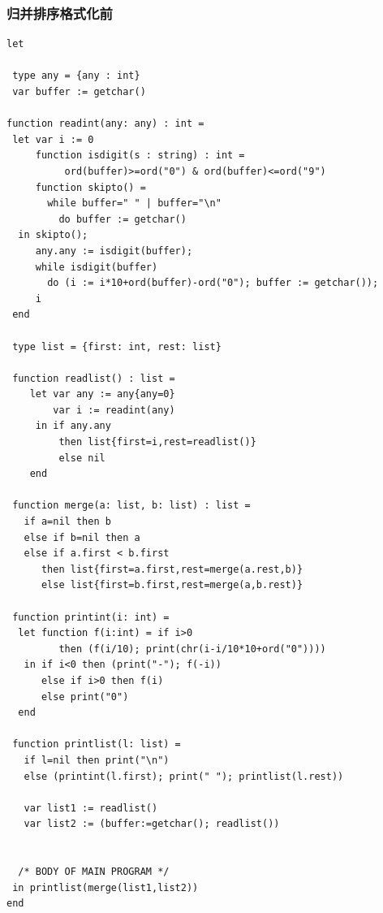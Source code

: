 \subsubsection{归并排序格式化前}
\begin{verbatim}
let 

 type any = {any : int}
 var buffer := getchar()

function readint(any: any) : int =
 let var i := 0
     function isdigit(s : string) : int = 
		  ord(buffer)>=ord("0") & ord(buffer)<=ord("9")
     function skipto() =
       while buffer=" " | buffer="\n"
         do buffer := getchar()
  in skipto();
     any.any := isdigit(buffer);
     while isdigit(buffer)
       do (i := i*10+ord(buffer)-ord("0"); buffer := getchar());
     i
 end

 type list = {first: int, rest: list}

 function readlist() : list =
    let var any := any{any=0}
        var i := readint(any)
     in if any.any
         then list{first=i,rest=readlist()}
         else nil
    end

 function merge(a: list, b: list) : list =
   if a=nil then b
   else if b=nil then a
   else if a.first < b.first 
      then list{first=a.first,rest=merge(a.rest,b)}
      else list{first=b.first,rest=merge(a,b.rest)}

 function printint(i: int) =
  let function f(i:int) = if i>0 
	     then (f(i/10); print(chr(i-i/10*10+ord("0"))))
   in if i<0 then (print("-"); f(-i))
      else if i>0 then f(i)
      else print("0")
  end

 function printlist(l: list) =
   if l=nil then print("\n")
   else (printint(l.first); print(" "); printlist(l.rest))

   var list1 := readlist()
   var list2 := (buffer:=getchar(); readlist())


  /* BODY OF MAIN PROGRAM */
 in printlist(merge(list1,list2))
end
\end{verbatim}

